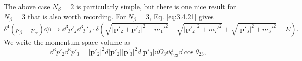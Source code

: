 The above case $N_\beta=2$ is particularly simple, but there is one nice result for $N_\beta=3$
that is also worth recording. For $N_\beta=3$, Eq. \eqref{eq:3.4.21} gives
\[
 \delta^4(p_\beta-p_\alpha)\dd\beta\longrightarrow \dd^3p'_2\dd^3p'_3
 \cdot\delta\left(\sqrt{|\mathbf{p}'_2+\mathbf{p}'_3|^2+m_1'^2}
 +\sqrt{|\mathbf{p}'_2|^2+m_2'^2}+\sqrt{|\mathbf{p}'_3|^2+m_3'^2}-E\right).
\]
We write the momentum-space volume as
\[
 \dd^3p'_2\dd^3p'_3=|\mathbf{p}'_2|^2d|\mathbf{p}'_2|
 |\mathbf{p}'_3|^2d|\mathbf{p}'_3|\dd\Omega_3\dd\phi_{23}\dd\cos\theta_{23},
\]
